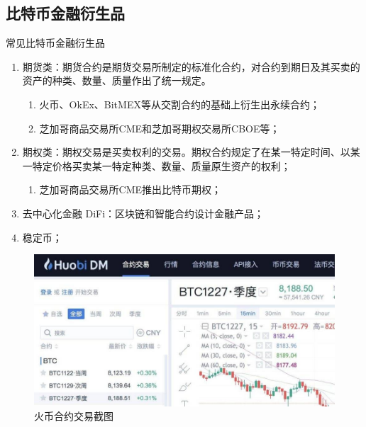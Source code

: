 \documentclass[11pt]{beamer}
\begin{document}
\subsection{比特币金融衍生品}

\begin{frame}{常见比特币金融衍生品}
	\begin{minipage}[t]{0.7\linewidth}
		\footnotesize
		\begin{enumerate}
			\item 期货类：期货合约是期货交易所制定的标准化合约，对合约到期日及其买卖的资产的种类、数量、质量作出了统一规定。
			      \begin{enumerate}
				      \item 火币、OkEx、BitMEX等从交割合约的基础上衍生出永续合约；
				      \item 芝加哥商品交易所CME和芝加哥期权交易所CBOE等；
			      \end{enumerate}
			\item 期权类：期权交易是买卖权利的交易。期权合约规定了在某一特定时间、以某一特定价格买卖某一特定种类、数量、质量原生资产的权利；
			      \begin{enumerate}
				      \item 芝加哥商品交易所CME推出比特币期权；
			      \end{enumerate}
			\item 去中心化金融 DiFi：区块链和智能合约设计金融产品；
			\item 稳定币；
		\end{enumerate}
	\end{minipage}%
	\begin{minipage}[t]{0.3\linewidth}
		\begin{figure}
			\centering
			\includegraphics[width=\linewidth]{figures/ccContracts}
			\caption{火币合约交易截图}
		\end{figure}
	\end{minipage}%
\end{frame}
\end{document}
